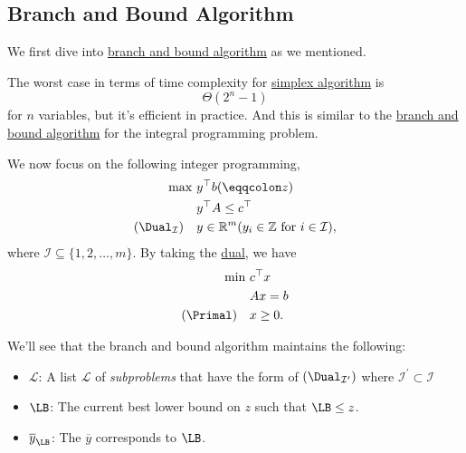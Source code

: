 \subsection{Branch and Bound Algorithm}\label{subsec:branch-and-bound}
We first dive into \hyperref[eg:branch-and-bound]{branch and bound algorithm} as we mentioned.
\begin{prev}
	The worst case in terms of time complexity for \hyperref[algo:simplex-algorithm]{simplex algorithm} is
	\[
		\Theta(2^n - 1)
	\]
	for \(n\) variables, but it's efficient in practice. And this is similar to the \hyperref[eg:branch-and-bound]{branch and bound algorithm} for the integral programming problem.
\end{prev}

We now focus on the following integer programming,
\[
	\begin{aligned}
		\max~                       & y^{\top}b(\eqqcolon z)                                              \\
		                            & y^{\top}A\leq c^{\top}                                              \\
		(\Dual_{\mathcal{I} })\quad & y\in\mathbb{R}^m(y_{i}\in\mathbb{Z} \text{ for } i\in \mathcal{I}),
	\end{aligned}
\]
where \(\mathcal{I} \subseteq \{1, 2, \dots , m\}\). By taking the \hyperref[def:dual]{dual}, we have
\[
	\begin{aligned}
		\min~          & c^{\top}x \\
		               & Ax = b    \\
		(\Primal)\quad & x\geq 0.
	\end{aligned}
\]

We'll see that the branch and bound algorithm maintains the following:
\begin{itemize}
	\item \(\mathcal{L} \): A list \(\mathcal{L} \) of \emph{subproblems} that have the form of \((\Dual_{\mathcal{I}^\prime})\) where \(\mathcal{I} ^\prime \subset \mathcal{I}\)
	\item \(\LB \): The current best lower bound on \(z\) such that \(\LB\leq z \).
	\item \(\overline{y}_{\LB}\): The \(\overline{y}\) corresponds to \(\LB\).
\end{itemize}

